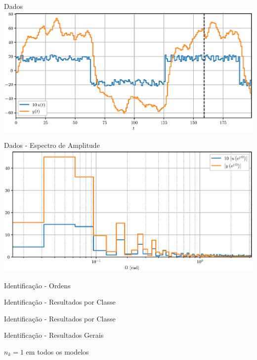 \documentclass{beamer}
\begin{document}
\begin{frame}{Dados}
  \includegraphics[width=\linewidth]{data_folded}
\end{frame}

\begin{frame}{Dados - Espectro de Amplitude}
  \includegraphics[width=\linewidth]{data_fourier_log}
\end{frame}

\begin{frame}{Identificação - Ordens}
  
\end{frame}

\begin{frame}{Identificação - Resultados por Classe}
  
\end{frame}

\begin{frame}{Identificação - Resultados por Classe}
  
\end{frame}

\begin{frame}{Identificação - Resultados Gerais}
  
  $n_k = 1$ em todos os modelos
\end{frame}
\end{document}
